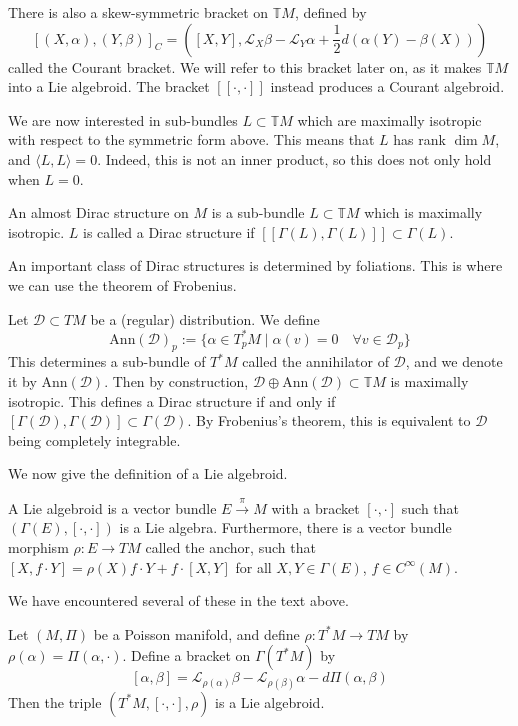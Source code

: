 \begin{remark}
  There is also a skew-symmetric bracket on $\mathbb{T}M$, defined by
  $$[(X,\alpha),(Y,\beta)]_C=([X,Y],\mathcal{L}_X\beta-\mathcal{L}_Y\alpha+\frac{1}{2}d(\alpha(Y)-\beta(X)))$$
  called the Courant bracket. We will refer to this bracket later on, as it makes $\mathbb{T}M$ into a Lie algebroid. The bracket $[\![\cdot,\cdot]\!]$ instead produces a Courant algebroid.
\end{remark}
We are now interested in sub-bundles $L\subset\mathbb{T}M$ which are maximally isotropic with respect to the symmetric form above. This means that $L$ has rank $\dim M$, and $\langle L,L\rangle=0$. Indeed, this is not an inner product, so this does not only hold when $L=0$.
\begin{definition}
  An almost Dirac structure on $M$ is a sub-bundle $L\subset\mathbb{T}M$ which is maximally isotropic. $L$ is called a Dirac structure if $[\![\Gamma(L),\Gamma(L)]\!]\subset\Gamma(L)$.
\end{definition}
An important class of Dirac structures is determined by foliations. This is where we can use the theorem of Frobenius.
\begin{example}
  Let $\mathcal{D}\subset TM$ be a (regular) distribution. We define $$\text{Ann}(\mathcal{D})_p:=\{\alpha\in T_p^*M\mid \alpha(v)=0\quad\forall v\in \mathcal{D}_p\}$$
  This determines a sub-bundle of $T^*M$ called the annihilator of $\mathcal{D}$, and we denote it by $\text{Ann}(\mathcal{D})$. Then by construction, $\mathcal{D}\oplus\text{Ann}(\mathcal{D})\subset\mathbb{T}M$ is maximally isotropic. This defines a Dirac structure if and only if $[\Gamma(\mathcal{D}),\Gamma(\mathcal{D})]\subset\Gamma(\mathcal{D})$. By Frobenius's theorem, this is equivalent to $\mathcal{D}$ being completely integrable.
\end{example}
We now give the definition of a Lie algebroid.
\begin{definition}
  A Lie algebroid is a vector bundle $E\xrightarrow{\pi}M$ with a bracket $[\cdot,\cdot]$ such that $(\Gamma(E),[\cdot,\cdot])$ is a Lie algebra. Furthermore, there is a vector bundle morphism $\rho:E\to TM$ called the anchor, such that $[X,f\cdot Y]=\rho(X)f\cdot Y+f\cdot[X,Y]$ for all $X,Y\in\Gamma(E)$, $f\in C^\infty(M)$.
\end{definition}
We have encountered several of these in the text above.
\begin{example}
  Let $(M,\Pi)$ be a Poisson manifold, and define $\rho:T^*M\to TM$ by $\rho(\alpha)=\Pi(\alpha,\cdot)$. Define a bracket on $\Gamma(T^*M)$ by $$[\alpha,\beta]=\mathcal{L}_{\rho(\alpha)}\beta-\mathcal{L}_{\rho(\beta)}\alpha-d\Pi(\alpha,\beta)$$
  Then the triple $(T^*M,[\cdot,\cdot],\rho)$ is a Lie algebroid.
\end{example}
